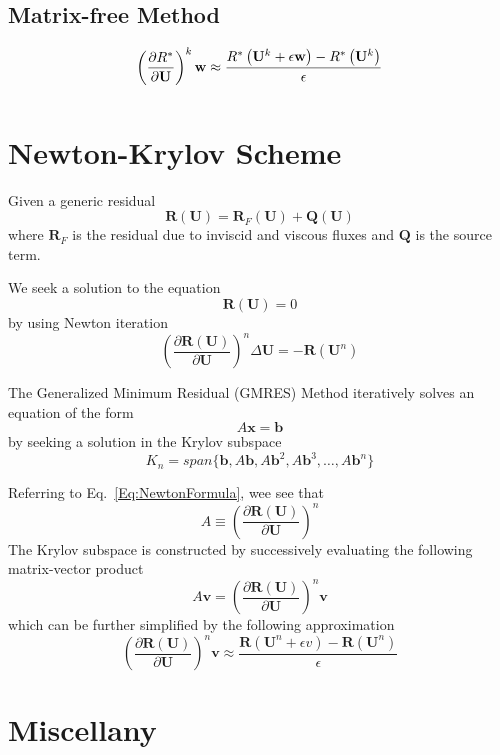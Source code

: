 \documentclass[a4paper]{article}
\begin{document}
\subsection{Matrix-free Method}
\begin{equation}
\left(\frac{\partial R^*}{\partial\mathbf{U}}\right)^k \mathbf{w}
\approx
\frac{R^*\left(\mathbf{U}^k + \epsilon\mathbf{w}\right) - R^*\left(\mathbf{U}^k\right)}{\epsilon}
\end{equation}
\begin{equation}
\end{equation}

\section{Newton-Krylov Scheme}

Given a generic residual
\[
\mathbf{R}(\mathbf{U}) = \mathbf{R}_F(\mathbf{U}) + \mathbf{Q}(\mathbf{U})
\]
where $\mathbf{R}_F$ is the residual due to inviscid and viscous fluxes and $\mathbf{Q}$ is the source term.

We seek a solution to the equation
\[
\mathbf{R}(\mathbf{U}) = 0
\]
by using Newton iteration
\begin{equation}
\left(\frac{\partial\mathbf{R}(\mathbf{U})}{\partial\mathbf{U}}\right)^n \Delta\mathbf{U}
=
-\mathbf{R}(\mathbf{U}^n)
\label{Eq:NewtonFormula}
\end{equation}

The Generalized Minimum Residual (GMRES) Method iteratively solves an equation of the form
\[
A\mathbf{x} = \mathbf{b}
\]
by seeking a solution in the Krylov subspace
\[
K_n = span\{ \mathbf{b}, A\mathbf{b}, A\mathbf{b}^2, A\mathbf{b}^3, \ldots, A\mathbf{b}^n \}
\]

Referring to Eq.~\ref{Eq:NewtonFormula}, wee see that
\[
A \equiv \left(\frac{\partial\mathbf{R}(\mathbf{U})}{\partial\mathbf{U}}\right)^n
\]
The Krylov subspace is constructed by successively evaluating the following matrix-vector product
\[
A\mathbf{v} = 
\left(\frac{\partial\mathbf{R}(\mathbf{U})}{\partial\mathbf{U}}\right)^n \mathbf{v}
\]
which can be further simplified by the following approximation
\[
\left(\frac{\partial\mathbf{R}(\mathbf{U})}{\partial\mathbf{U}}\right)^n \mathbf{v}
\approx
\frac{
\mathbf{R}(\mathbf{U}^n + \epsilon v) - \mathbf{R}(\mathbf{U}^n)
}
{
\epsilon
}
\]



\section{Miscellany}
\end{document}
